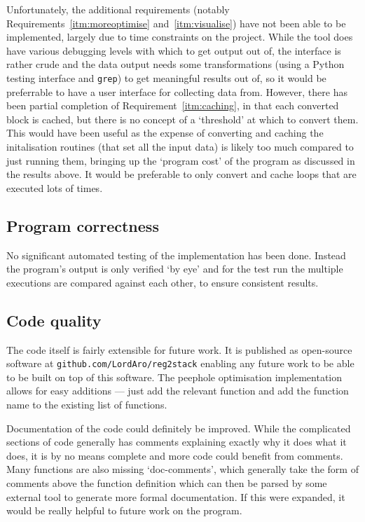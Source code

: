 Unfortunately, the additional requirements (notably
Requirements~\ref{itm:moreoptimise} and~\ref{itm:visualise}) have not been able
to be implemented, largely due to time constraints on the project. While the
tool does have various debugging levels with which to get output out of, the
interface is rather crude and the data output needs some transformations (using
a Python testing interface and \texttt{grep}) to get meaningful results out of,
so it would be preferrable to have a user interface for collecting data from.
However, there has been partial completion of Requirement~\ref{itm:caching}, in
that each converted block is cached, but there is no concept of a `threshold' at
which to convert them. This would have been useful as the expense of converting
and caching the initalisation routines (that set all the input data) is likely
too much compared to just running them, bringing up the `program cost' of the
program as discussed in the results above. It would be preferable to only
convert and cache loops that are executed lots of times.

\subsection{Program correctness}
No significant automated testing of the implementation has been done. Instead
the program's output is only verified `by eye' and for the test run the multiple
executions are compared against each other, to ensure consistent results.

\subsection{Code quality}
The code itself is fairly extensible for future work. It is published as
open-source software at \texttt{github.com/LordAro/reg2stack} enabling any
future work to be able to be built on top of this software. The peephole
optimisation implementation allows for easy additions --- just add the relevant
function and add the function name to the existing list of functions.

Documentation of the code could definitely be improved. While the complicated
sections of code generally has comments explaining exactly why it does what it
does, it is by no means complete and more code could benefit from comments. Many
functions are also missing `doc-comments', which generally take the form of
comments above the function definition which can then be parsed by some external
tool to generate more formal documentation. If this were expanded, it would be
really helpful to future work on the program.
